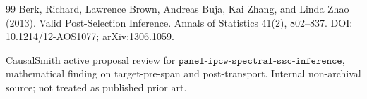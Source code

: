 \documentclass{article}
\begin{document}
\begin{thebibliography}{99}
   Berk, Richard, Lawrence Brown, Andreas Buja, Kai Zhang, and Linda Zhao (2013). Valid Post-Selection Inference. Annals of Statistics 41(2), 802--837. DOI: 10.1214/12-AOS1077; arXiv:1306.1059.

   CausalSmith active proposal review for \(\texttt{panel-ipcw-spectral-ssc-inference}\), mathematical finding on target-pre-span and post-transport. Internal non-archival source; not treated as published prior art.

\end{thebibliography}
\end{document}
